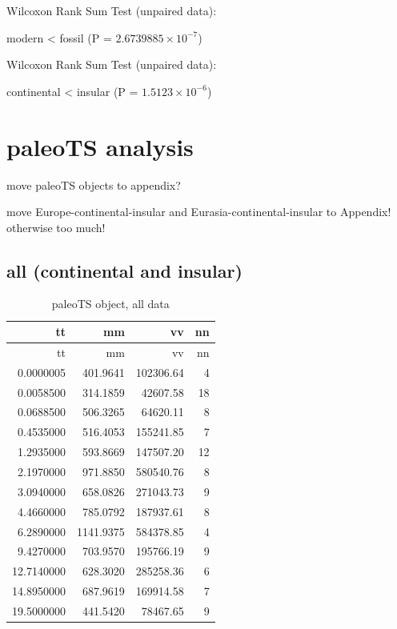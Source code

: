 Wilcoxon Rank Sum Test (unpaired data):

modern \textless{} fossil (P = \(2.6739885\times 10^{-7}\))


Wilcoxon Rank Sum Test (unpaired data):

continental \textless{} insular (P = \(1.5123\times 10^{-6}\))




\FloatBarrier

\section{paleoTS analysis}\label{paleots-analysis}

move paleoTS objects to appendix?

move Europe-continental-insular and Eurasia-continental-insular to Appendix! otherwise too much!



\subsection{all (continental and
	insular)}\label{all-continental-and-insular}


\begin{longtable}[]{@{}rrrr@{}}
	\caption{paleoTS object, all data}
	\label{tab:pTSall}\tabularnewline
	\toprule
	tt & mm & vv & nn\tabularnewline
	\midrule
	\endfirsthead
	\toprule
	tt & mm & vv & nn\tabularnewline
	\midrule
	\endhead
	0.0000005 & 401.9641 & 102306.64 & 4\tabularnewline
	0.0058500 & 314.1859 & 42607.58 & 18\tabularnewline
	0.0688500 & 506.3265 & 64620.11 & 8\tabularnewline
	0.4535000 & 516.4053 & 155241.85 & 7\tabularnewline
	1.2935000 & 593.8669 & 147507.20 & 12\tabularnewline
	2.1970000 & 971.8850 & 580540.76 & 8\tabularnewline
	3.0940000 & 658.0826 & 271043.73 & 9\tabularnewline
	4.4660000 & 785.0792 & 187937.61 & 8\tabularnewline
	6.2890000 & 1141.9375 & 584378.85 & 4\tabularnewline
	9.4270000 & 703.9570 & 195766.19 & 9\tabularnewline
	12.7140000 & 628.3020 & 285258.36 & 6\tabularnewline
	14.8950000 & 687.9619 & 169914.58 & 7\tabularnewline
	19.5000000 & 441.5420 & 78467.65 & 9\tabularnewline
	\bottomrule
\end{longtable}

